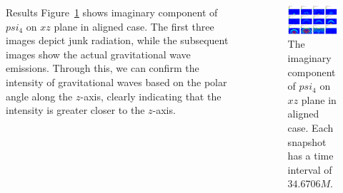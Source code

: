 \documentclass[noamssymb]{beamer}
\newlength{\sepwidth}
\newlength{\colwidth}
\newcommand{\separatorcolumn}{\begin{column}{\sepwidth}\end{column}}
\begin{document}
\begin{frame}[t]
\begin{columns}[t]
\begin{column}{\colwidth}
\begin{block}{Results}
    Figure~\ref{fig:psi4i} shows imaginary component of $psi_4$ on $xz$ plane in aligned case. The first three images depict junk radiation, while the subsequent images show the actual gravitational wave emissions. Through this, we can confirm the intensity of gravitational waves based on the polar angle along the $z$-axis, clearly indicating that the intensity is greater closer to the $z$-axis.

  \end{block}


\end{column}

\separatorcolumn

\begin{column}{\colwidth}

  \begin{block}{}
  	
  	\begin{figure}
  		\centering
  		\includegraphics[width=\columnwidth]{img/psi4i}
  		\caption{\label{fig:psi4i}The imaginary component of $psi_4$ on $xz$ plane in aligned case. Each snapshot has a time interval of $34.6706M$.}
  	\end{figure}
	

\end{block}
\end{column}
\end{columns}
\end{frame}
\end{document}
